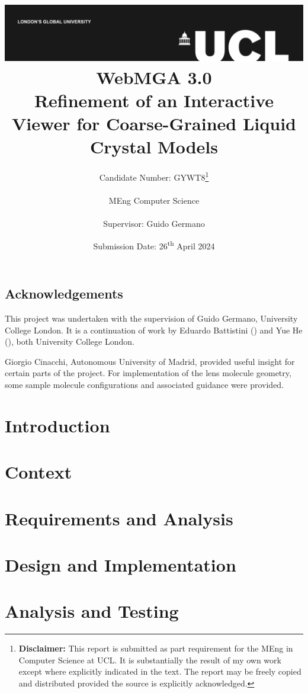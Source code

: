 \documentclass[a4paper,12pt]{report}
\title{
{\vspace{-14em} \includegraphics[width=\textwidth]{assets/images/ucl}}\\
{{\Huge WebMGA 3.0}}\\
{\large Refinement of an Interactive Viewer for Coarse-Grained Liquid Crystal Models}\\
}
\date{Submission Date: 26\textsuperscript{th} April 2024}
\author{Candidate Number: GYWT8\thanks{
{\bf Disclaimer:}
This report is submitted as part requirement for the MEng in Computer Science at UCL. It is
substantially the result of my own work except where explicitly indicated in the text. The report may be freely copied and distributed provided the source is explicitly acknowledged.}
\\ \\
MEng Computer Science\\ \\
Supervisor: Guido Germano}
\begin{document}
 
\onehalfspacing
\maketitle

\begin{abstract}

\end{abstract}

\tableofcontents

\setcounter{page}{1}
\section{Acknowledgements}
This project was undertaken with the supervision of Guido Germano, University College London. It is a continuation of work by Eduardo Battistini (\citeyear{Battistini_2021}) and Yue He (\citeyear{webmga_2}), both University College London.

Giorgio Cinacchi, Autonomous University of Madrid, provided useful insight for certain parts of the project. For implementation of the lens molecule geometry, some sample molecule configurations and associated guidance were provided.

\chapter{Introduction}


\chapter{Context}
\label{context_section}


\chapter{Requirements and Analysis}
\label{req_section}


\chapter{Design and Implementation}
\label{imp_section}








\chapter{Analysis and Testing}
\label{analysis_sec}

\end{document}
